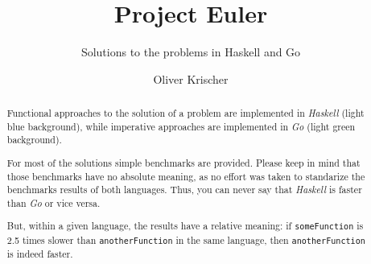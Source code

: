 \documentclass{scrreprt}
\numberwithin{equation}{chapter}
\begin{document}
\title{Project Euler}
\author{Oliver Krischer}
\subtitle{Solutions to the problems in Haskell and Go}
\maketitle
\begin{abstract}
  Functional approaches to the solution of a problem are implemented in \emph{Haskell}
  (light blue background), while imperative approaches are implemented in \emph{Go}
  (light green background).

  For most of the solutions simple benchmarks are provided.
  Please keep in mind that those benchmarks have no absolute meaning, as no effort was taken
  to standarize the benchmarks results of both languages.
  Thus, you can never say that \emph{Haskell} is faster than \emph{Go} or vice versa.

  But, within a given language, the results have a relative meaning:
  if \texttt{someFunction} is 2.5 times slower than \texttt{anotherFunction}
  in the same language, then \texttt{anotherFunction} is indeed faster.
\end{abstract}
\tableofcontents





\end{document}
